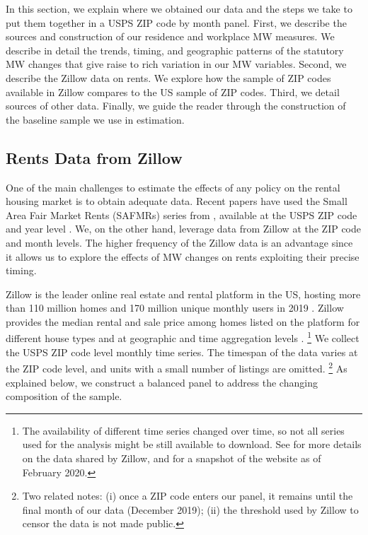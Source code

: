 
In this section, we explain where we obtained our data and the steps we take to 
put them together in a USPS ZIP code by month panel.
First, we describe the sources and construction of our residence and workplace 
MW measures.
We describe in detail the trends, timing, and geographic patterns of the 
statutory MW changes that give raise to rich variation in our MW variables.
Second, we describe the Zillow data on rents.
We explore how the sample of ZIP codes available in Zillow compares to the US 
sample of ZIP codes.
Third, we detail sources of other data.
Finally, we guide the reader through the construction of the baseline sample we
use in estimation.

\subsection{Rents Data from Zillow}

One of the main challenges to estimate the effects of any policy on the rental
housing market is to obtain adequate data.
Recent papers have used the Small Area Fair Market Rents (SAFMRs) series from 
\textcite{hudSAFMR}, available at the USPS ZIP code and year level 
\parencite{Tidemann2018, Yamagishi2019}.
We, on the other hand, leverage data from Zillow at the ZIP code and month 
levels.
The higher frequency of the Zillow data is an advantage since it allows us to 
explore the effects of MW changes on rents exploiting their precise timing.

Zillow is the leader online real estate and rental platform in the US, hosting
more than 110 million homes and 170 million unique monthly users in 2019 
\parencite{ZillowFacts}.
Zillow provides the median rental and sale price among homes listed on the 
platform for different house types and at geographic and time aggregation 
levels \parencite{ZillowData}.%
\footnote{The availability of different time series changed over time, so not 
all series used for the analysis might be still available to download.
See \textcite{ZillowData} for more details on the data shared by Zillow, and 
\textcite{ZillowDataArchive} for a snapshot of the website as of February 2020.} 
We collect the USPS ZIP code level monthly time series.
The timespan of the data varies at the ZIP code level, and units with a small 
number of listings are omitted.%
\footnote{Two related notes:
(i) once a ZIP code enters our panel, it remains until the final month of our 
data (December 2019);
(ii) the threshold used by Zillow to censor the data is not made public.}
As explained below, we construct a balanced panel to address the changing 
composition of the sample.


